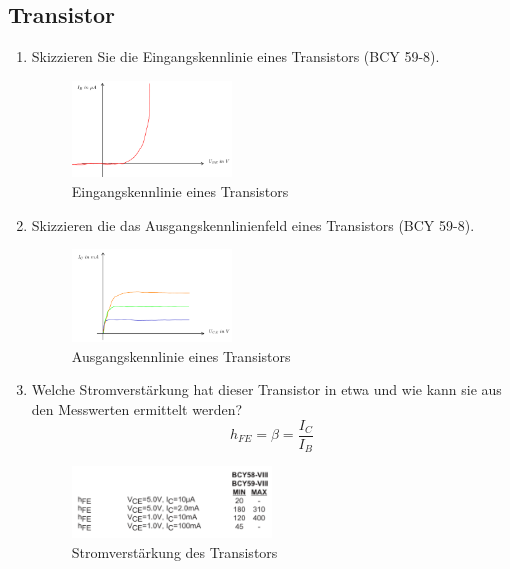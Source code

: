 \pagebreak
\subsection{Transistor}
\begin{enumerate}[label=\alph*)]
  \item Skizzieren Sie die Eingangskennlinie eines Transistors (BCY 59-8).
    \begin{figure}[h!]
      \begin{center}
        \includegraphics[width=0.4\textwidth]{img/2.2.1.1}
      \end{center}
      \caption{Eingangskennlinie eines Transistors}\label{img:2.2.1.1}
    \end{figure}
    
  \item Skizzieren die das Ausgangskennlinienfeld eines Transistors (BCY 59-8). 
    \begin{figure}[h!]
      \begin{center}
        \includegraphics[width=0.4\textwidth]{img/2.2.2.1}
      \end{center}
      \caption{Ausgangskennlinie eines Transistors}\label{img:2.2.2.1}
    \end{figure}
    
  \item Welche Stromverstärkung hat dieser Transistor in etwa und wie kann sie aus den Messwerten ermittelt werden? \\
    $$h_{FE}=\beta = \frac{I_C}{I_B}$$
    \begin{figure}[h!]
      \begin{center}
        \includegraphics[width=0.5\textwidth]{img/2.2.3.1}
      \end{center}
      \caption{Stromverstärkung des Transistors}\label{img:2.2.3.1}
    \end{figure}
    

\end{enumerate}
